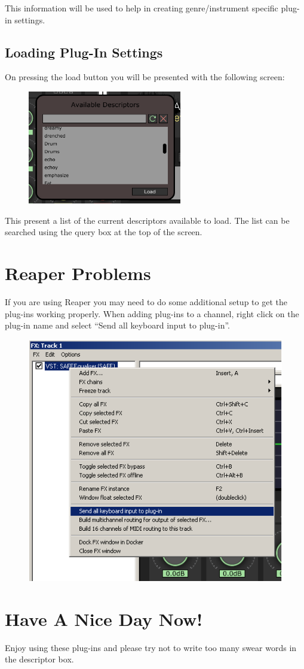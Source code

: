 \documentclass[a4paper]{article}
\begin{document}
		This information will be used to help in creating genre/instrument specific plug-in settings.

	\subsection*{Loading Plug-In Settings}
		On pressing the load button you will be presented with the following screen:

		\begin{figure}[h!]
			\centering
			\includegraphics[width=0.6\textwidth]{Images/Loading.png}
		\end{figure}

		This present a list of the current descriptors available to load. The list can be searched using the query box at the top of the screen.

\newpage
\section*{Reaper Problems}
	If you are using Reaper you may need to do some additional setup to get the plug-ins working properly. When adding plug-ins to a channel, right click on the plug-in name and select ``Send all keyboard input to plug-in''. 

	\begin{figure}[h!]
		\centering
		\includegraphics[scale=1]{Images/Reaper.png}
	\end{figure}

\section*{Have A Nice Day Now!}
	Enjoy using these plug-ins and please try not to write too many swear words in the descriptor box.
\end{document}
